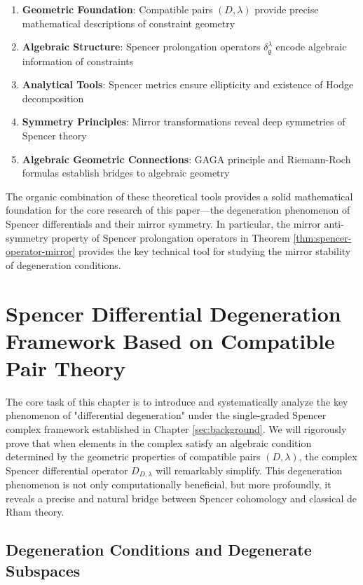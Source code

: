 \documentclass[a4paper,12pt]{extarticle}
\theoremstyle{plain}
\theoremstyle{definition}
\begin{document}
\begin{enumerate}
\item \textbf{Geometric Foundation}: Compatible pairs $(D,\lambda)$ provide precise mathematical descriptions of constraint geometry
\item \textbf{Algebraic Structure}: Spencer prolongation operators $\delta^\lambda_\mathfrak{g}$ encode algebraic information of constraints
\item \textbf{Analytical Tools}: Spencer metrics ensure ellipticity and existence of Hodge decomposition
\item \textbf{Symmetry Principles}: Mirror transformations reveal deep symmetries of Spencer theory
\item \textbf{Algebraic Geometric Connections}: GAGA principle and Riemann-Roch formulas establish bridges to algebraic geometry
\end{enumerate}

The organic combination of these theoretical tools provides a solid mathematical foundation for the core research of this paper—the degeneration phenomenon of Spencer differentials and their mirror symmetry. In particular, the mirror anti-symmetry property of Spencer prolongation operators in Theorem \ref{thm:spencer-operator-mirror} provides the key technical tool for studying the mirror stability of degeneration conditions.

\section{Spencer Differential Degeneration Framework Based on Compatible Pair Theory}
\label{sec:degeneration_framework}

The core task of this chapter is to introduce and systematically analyze the key phenomenon of "differential degeneration" under the single-graded Spencer complex framework established in Chapter \ref{sec:background}. We will rigorously prove that when elements in the complex satisfy an algebraic condition determined by the geometric properties of compatible pairs $(D,\lambda)$, the complex Spencer differential operator $D_{D,\lambda}$ will remarkably simplify. This degeneration phenomenon is not only computationally beneficial, but more profoundly, it reveals a precise and natural bridge between Spencer cohomology and classical de Rham theory.

\subsection{Degeneration Conditions and Degenerate Subspaces}
\label{sec:degenerate_condition_and_subspace}
\end{document}
